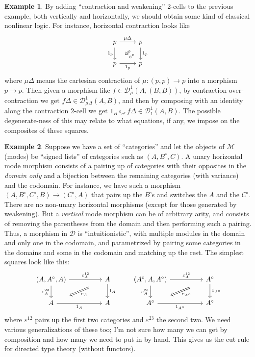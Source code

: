 \documentclass{article}
\theoremstyle{definition}
\newtheorem{eg}{Example}
\def\M{\mathcal{M}}
\def\D{\mathcal{D}}
\def\DD#1#2{\mathcal{D}^{#1}_{#2}}
\def\o{^{\circ}}
\def\twocell#1#2#3{\ar[from=#1,to=#2,phantom,""{name=1,near start},""{name=2,near end}]\ar[Rightarrow,from=1,to=2,"#3"]}
\def\drtwocell{\twocell{r}{d}}
\begin{document}
\begin{eg}\label{eg:nonlinear}
  By adding ``contraction and weakening'' 2-cells to the previous example, both vertically and horizontally, we should obtain some kind of classical nonlinear logic.
  For instance, horizontal contraction looks like
  \[\begin{tikzcd}
    p \ar[r,"\mu \Delta"] \ar[d,swap,"1_p"] \drtwocell{c^v}
    & p \ar[d,"1_p"]
    \\ p \ar[r,swap,"1_p"] & p
  \end{tikzcd}\]
  where $\mu\Delta$ means the cartesian contraction of $\mu:(p,p)\to p$ into a morphism $p\to p$.
  Then given a morphism like $f\in \DD{1}{\mu}(A,(B,B))$, by contraction-over-contraction we get $f\Delta \in \DD{1}{\mu\Delta}(A,B)$, and then by composing with an identity along the contraction 2-cell we get $1_B \circ_{c^v} f\Delta \in \DD{1}{1}(A,B)$.
  The possible degenerate-ness of this may relate to what equations, if any, we impose on the composites of these squares.
\end{eg}

\begin{eg}\label{eg:dirtt}
  Suppose we have a set of ``categories'' and let the objects of $\M$ (modes) be ``signed lists'' of categories such as $(A,B\o,C)$.
  A unary horizontal mode morphism consists of a pairing up of categories with their opposites in the \emph{domain only} and a bijection between the remaining categories (with variance) and the codomain.
  For instance, we have such a morphism $(A,B\o,C\o,B) \to (C\o,A)$ that pairs up the $B$'s and switches the $A$ and the $C\o$.
  There are no non-unary horizontal morphisms (except for those generated by weakening).
  But a \emph{vertical} mode morphism can be of arbitrary arity, and consists of removing the parentheses from the domain and then performing such a pairing.
  Thus, a morphism in $\D$ is ``intuitionistic'', with multiple modules in the domain and only one in the codomain, and parametrized by pairing some categories in the domains and some in the codomain and matching up the rest.
  The simplest squares look like this:
  \[\begin{tikzcd}[column sep=huge]
    (A,A\o,A) \ar[r,"\varepsilon^{12}_A"] \ar[d,swap,"\varepsilon^{23}_A"] \drtwocell{e_A}
    & A \ar[d,"1_A"]
    \\ A \ar[r,swap,"1_A"] & A
  \end{tikzcd}
  \qquad
  \begin{tikzcd}[column sep=huge]
    (A\o,A,A\o) \ar[r,"\varepsilon^{12}_A"] \ar[d,swap,"\varepsilon^{23}_A"] \drtwocell{e_{A\o}}
    & A\o \ar[d,"1_{A\o}"]
    \\ A\o \ar[r,swap,"1_{A\o}"] & A\o
  \end{tikzcd}\]
  where $\varepsilon^{12}$ pairs up the first two categories and $\varepsilon^{23}$ the second two.
  We need various generalizations of these too; I'm not sure how many we can get by composition and how many we need to put in by hand.
  This gives us the cut rule for directed type theory (without functors).
\end{eg}
\end{document}
